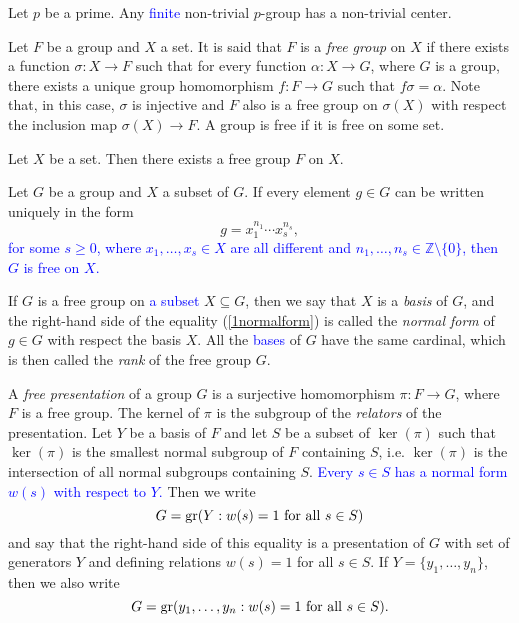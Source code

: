 \begin{theorem}
    Let $p$ be a prime. Any \textcolor{blue}{finite} non-trivial $p$-group has a non-trivial center.
\end{theorem}

Let $F$ be a group and $X$ a set. It is said that $F$ is a \emph{free group} 
on $X$ if there exists a function
$\sigma\colon X\rightarrow F$ such that for every function $\alpha\colon X\rightarrow G$, where $G$ is a group, there exists 
a unique group homomorphism $f\colon F\rightarrow G$ such that $f\sigma=\alpha$. Note that, in this case, 
$\sigma$ is injective and $F$ also is a free group on $\sigma(X)$ with respect the inclusion map $\sigma(X)\rightarrow F$.
A group is free if it is free on some set.

\begin{theorem}
    Let $X$ be a set. Then there exists a free group $F$ on $X$.
\end{theorem}

\begin{proposition}
    Let $G$ be a group and $X$ a subset of $G$. If every element $g\in G$ can be written uniquely in the form
    \begin{equation}\label{1normalform}
    g=x_1^{n_1}\cdots x_s^{n_s},
    \end{equation}
    \textcolor{blue}{
    for some $s\geq 0$, 
    where $x_1,\dots,x_s\in X$ are all different and $n_1,\dots,n_s\in \mathbb{Z}\setminus \{0\}$, 
    then $G$ is free on $X$. }
\end{proposition}

If $G$ is a free group on \textcolor{blue}{a subset} $X\subseteq G$, 
then we say that $X$ is a {\em basis} of $G$, and the 
right-hand side of the equality (\ref{1normalform}) is called the {\em normal form} 
of $g\in G$ with respect the basis $X$. All the \textcolor{blue}{bases} 
of $G$ have the same cardinal,
which is then called the {\em rank} of the free group $G$.

A {\em free presentation} of a group $G$ is a surjective homomorphism $\pi \colon F\rightarrow G$, where $F$ is a free group. The kernel of $\pi$ is the subgroup of the {\em relators} of the presentation. Let $Y$ be a basis of $F$ and let $S$ be a subset of $\ker(\pi)$ such that $\ker(\pi)$ is the smallest normal subgroup of $F$ containing $S$, i.e. $\ker(\pi)$ is the intersection of all normal subgroups containing $S$. \textcolor{blue}{Every $s\in S$ has a normal form $w(s)$ with respect to $Y$.}
Then we write
\[
G=\operatorname{gr}(Y: w(s)=1\mbox{ for all }s\in S)
\]
and say that the right-hand side of this equality is a presentation of $G$ with set of generators $Y$ and defining relations $w(s)=1$ 
for all $s\in S$. If $Y=\{ y_1,\dots, y_n\}$, then we also write
\[
G=\operatorname{gr}(y_1,\dots, y_n: w(s)=1\mbox{ for all }s\in S).
\]

